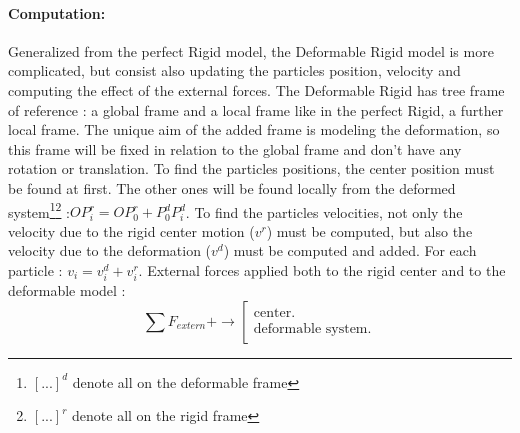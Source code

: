\documentclass[a4paper,10pt]{article}
\begin{document}
\paragraph{Computation: } Generalized from the perfect Rigid model, the Deformable Rigid model is more complicated, but consist also updating the particles position, velocity and computing the effect of the external forces. The Deformable Rigid has tree frame of reference : a global frame and a local frame like in the perfect Rigid, a further local frame. The unique aim of the added frame is modeling the deformation, so this frame will be fixed in relation to the global frame and don't have any rotation or translation. To find the particles positions, the center position must be found at first. The other ones will be found locally from the deformed system\footnote[1]{$[...]^d$ denote all on the deformable frame}\footnote[2]{$[...]^r$ denote all on the rigid frame} :$OP^r_i=OP^r_0+P^d_0P^d_i$. To find the particles velocities, not only the velocity due to the rigid center motion ($v^r$) must be computed, but also the velocity due to the deformation ($v^d$) must be computed and added. For each particle : $v_i=v^d_i+v^r_i$. External forces applied both to the rigid center and to the deformable model :
\[\sum F_{extern} + \rightarrow 
\left[
\begin{array}{l}
\text{center.} \\
\text{deformable system.}
\end{array}
\right.
\]
\newpage         
\end{document}
